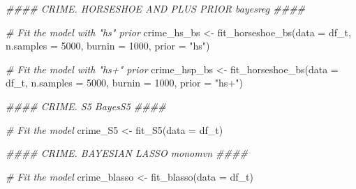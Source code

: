 \documentclass[
  11pt,
]{article}
\newenvironment{Shaded}{}{}
\newcommand{\AttributeTok}[1]{\textcolor[rgb]{0.49,0.56,0.16}{#1}}
\newcommand{\CommentTok}[1]{\textcolor[rgb]{0.38,0.63,0.69}{\textit{#1}}}
\newcommand{\DecValTok}[1]{\textcolor[rgb]{0.25,0.63,0.44}{#1}}
\newcommand{\DocumentationTok}[1]{\textcolor[rgb]{0.73,0.13,0.13}{\textit{#1}}}
\newcommand{\FunctionTok}[1]{\textcolor[rgb]{0.02,0.16,0.49}{#1}}
\newcommand{\NormalTok}[1]{#1}
\newcommand{\OtherTok}[1]{\textcolor[rgb]{0.00,0.44,0.13}{#1}}
\newcommand{\StringTok}[1]{\textcolor[rgb]{0.25,0.44,0.63}{#1}}
\begin{document}
\begin{Shaded}
\begin{Highlighting}[]
\DocumentationTok{\#\#\#\# CRIME. HORSESHOE AND PLUS PRIOR \textquotesingle{}bayesreg\textquotesingle{} \#\#\#\#}

\CommentTok{\# Fit the model with "hs" prior}
\NormalTok{crime\_hs\_bs }\OtherTok{\textless{}{-}} \FunctionTok{fit\_horseshoe\_bs}\NormalTok{(}\AttributeTok{data =}\NormalTok{ df\_t, }\AttributeTok{n.samples =} \DecValTok{5000}\NormalTok{, }\AttributeTok{burnin =} \DecValTok{1000}\NormalTok{, }
                                \AttributeTok{prior =} \StringTok{"hs"}\NormalTok{)}


\CommentTok{\# Fit the model with "hs+" prior}
\NormalTok{crime\_hsp\_bs }\OtherTok{\textless{}{-}} \FunctionTok{fit\_horseshoe\_bs}\NormalTok{(}\AttributeTok{data =}\NormalTok{ df\_t, }\AttributeTok{n.samples =} \DecValTok{5000}\NormalTok{, }\AttributeTok{burnin =} \DecValTok{1000}\NormalTok{, }
                                 \AttributeTok{prior =} \StringTok{"hs+"}\NormalTok{)}

\DocumentationTok{\#\#\#\# CRIME. S5 \textquotesingle{}BayesS5\textquotesingle{} \#\#\#\#}

\CommentTok{\# Fit the model}
\NormalTok{crime\_S5 }\OtherTok{\textless{}{-}} \FunctionTok{fit\_S5}\NormalTok{(}\AttributeTok{data =}\NormalTok{ df\_t)}

\DocumentationTok{\#\#\#\# CRIME. BAYESIAN LASSO \textquotesingle{}monomvn\textquotesingle{} \#\#\#\#}

\CommentTok{\# Fit the model}
\NormalTok{crime\_blasso }\OtherTok{\textless{}{-}} \FunctionTok{fit\_blasso}\NormalTok{(}\AttributeTok{data =}\NormalTok{ df\_t)}
\end{Highlighting}
\end{Shaded}
\end{document}
